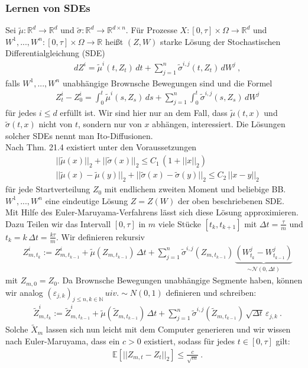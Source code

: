 \documentclass[12pt]{article}
\newcommand{\E}{\mathbb{E}}
\newcommand{\R}{\mathbb{R}}
\newcommand{\tZ}{\widetilde{Z}}
\newcommand{\tX}{\widetilde{X}}
\newcommand{\tmu}{\widetilde{\mu}}
\newcommand{\tsig}{\widetilde{\sigma}}
\newcommand{\N}{\mathbb{N}}
\begin{document}
	\subsubsection[Lernen von SDEs]{Lernen von SDEs}
	Sei $\tmu: \R^d \rightarrow \R^d$ und $\tsig: \R^d \rightarrow \R^{d \times n}$. Für Prozesse $X: [0,\tau] \times \Omega \rightarrow \R^d$ und $W^1,...,W^n : [0,\tau] \times \Omega \rightarrow \R$ heißt $(Z,W)$ starke Lösung der Stochastischen Differentialgleichung (SDE)
	\begin{align*}
		& dZ^i = \tmu^i(t,Z_t) \, dt + \sum\limits_{j=1}^n \tsig^{i,j}(t,Z_t) \, dW^j \ ,
	\end{align*}
	falls $W^1,...,W^n$ unabhängige Brownsche Bewegungen sind und die Formel
	\begin{align*}
		& Z_t^i - Z_0^i = \int_0^t \tmu^i(s,Z_s) \, ds + \sum\limits_{j=1}^n \int_0^t \tsig^{i,j}(s,Z_s) \, dW^j \tag{1}
	\end{align*}
	für jedes $i \leq d$ erfüllt ist. Wir sind hier nur an dem Fall, dass $\tmu(t,x)$ und $\tsig(t,x)$ nicht von $t$, sondern nur von $x$ abhängen, interessiert. Die Lösungen solcher SDEs nennt man Ito-Diffusionen.\\
	Nach \cite{PfaffiSkript} Thm. 21.4 existiert unter den Voraussetzungen
	\begin{align*}
		& ||\tmu(x)||_2 + ||\tsig(x)||_2 \leq C_1 \, (1+||x||_2)\\
		& ||\tmu(x)-\tmu(y)||_2 + ||\tsig(x)-\tsig(y)||_2 \leq C_2 \, ||x-y||_2 \tag{2}
	\end{align*}
	für jede Startverteilung $Z_0$ mit endlichem zweiten Moment und beliebige BB. $W^1,...,W^n$ eine eindeutige Lösung $Z = Z(W)$ der oben beschriebenen SDE.\\
	Mit Hilfe des Euler-Maruyama-Verfahrens lässt sich diese Lösung approximieren. Dazu Teilen wir das Intervall $[0,\tau]$ in $m$ viele Stücke $[t_k,t_{k+1}]$ mit $\Delta t = \frac{\tau}{m}$ und $t_k = k\, \Delta t = \frac{k\tau}{m}$. Wir definieren rekursiv
	\begin{align*}
		& Z^i_{m,t_k} := Z^i_{m,t_{k-1}} + \tmu(Z_{m,t_{k-1}}) \, \Delta t + \sum\limits_{j=1}^n \tsig^{i,j}(Z_{m,t_{k-1}}) \, \underbrace{(W^j_{t_k}-W^j_{t_{k-1}})}_{\sim \mathcal{N}(0,\Delta t)} 
	\end{align*}
	mit $Z_{m,0} = Z_0$. Da Brownsche Bewegungen unabhängige Segmente haben, können wir analog $(\varepsilon_{j,k})_{j \leq n, k \in \N} \, uiv. \sim N(0,1)$ definieren und schreiben:
	\begin{align*}
		& \tZ^i_{m,t_k} := \tZ^i_{m,t_{k-1}} + \tmu(\tZ_{m,t_{k-1}}) \, \Delta t + \sum\limits_{j=1}^n \tsig^{i,j}(\tZ_{m,t_{k-1}}) \, \sqrt{\Delta t} \, \varepsilon_{j,k} \ .
	\end{align*}
	Solche $\tX_m$ lassen sich nun leicht mit dem Computer generieren und wir wissen nach Euler-Maruyama, dass ein $c > 0$ existiert, sodass für jedes $t \in [0,\tau]$ gilt:
	\begin{align*}
		& \E[||Z_{m,t} - Z_t||_2] \leq \frac{c}{\sqrt{m}} \ .
	\end{align*}
	
\end{document}
